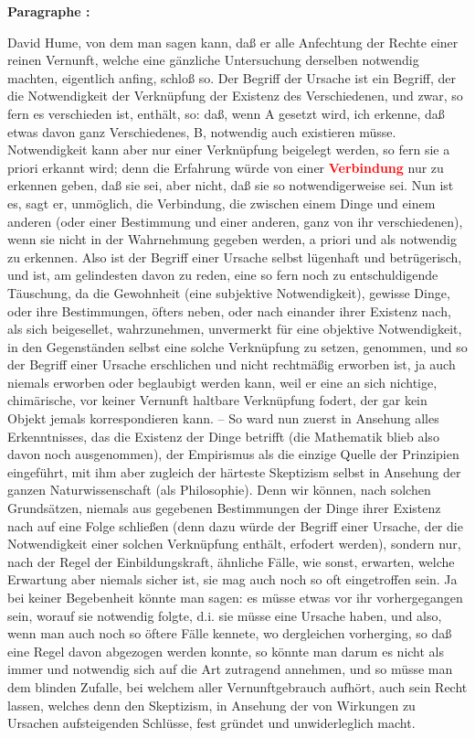 \documentclass[a4paper,12pt,twoside]{book}
\newcommand{\match}[1]{\textcolor{red}{\textbf{#1}}}
\begin{document}
	\noindent\textbf{Paragraphe : }
	
	David Hume, von dem man sagen kann, daß er alle Anfechtung der Rechte einer reinen Vernunft, welche eine gänzliche Untersuchung derselben notwendig machten, eigentlich anfing, schloß so. Der Begriff der Ursache ist ein Begriff, der die Notwendigkeit der Verknüpfung der Existenz des Verschiedenen, und zwar, so fern es verschieden ist, enthält, so: daß, wenn A gesetzt wird, ich erkenne, daß etwas davon ganz Verschiedenes, B, notwendig auch existieren müsse. Notwendigkeit kann aber nur einer Verknüpfung beigelegt werden, so fern sie a priori erkannt wird; denn die Erfahrung würde von einer \match{Verbindung} nur zu erkennen geben, daß sie sei, aber nicht, daß sie so notwendigerweise sei. Nun ist es, sagt er, unmöglich, die Verbindung, die zwischen einem Dinge und einem anderen (oder einer Bestimmung und einer anderen, ganz von ihr verschiedenen), wenn sie nicht in der Wahrnehmung gegeben werden, a priori und als notwendig zu erkennen. Also ist der Begriff einer Ursache selbst lügenhaft und betrügerisch, und ist, am gelindesten davon zu reden, eine so fern noch zu entschuldigende Täuschung, da die Gewohnheit (eine subjektive Notwendigkeit), gewisse Dinge, oder ihre Bestimmungen, öfters neben, oder nach einander ihrer Existenz nach, als sich beigesellet, wahrzunehmen, unvermerkt für eine objektive Notwendigkeit, in den Gegenständen selbst eine solche Verknüpfung zu setzen, genommen, und so der Begriff einer Ursache erschlichen und nicht rechtmäßig erworben ist, ja auch niemals erworben oder beglaubigt werden kann, weil er eine an sich nichtige, chimärische, vor keiner Vernunft haltbare Verknüpfung fodert, der gar kein Objekt jemals korrespondieren kann. – So ward nun zuerst in Ansehung alles Erkenntnisses, das die Existenz der Dinge betrifft (die Mathematik blieb also davon noch ausgenommen), der Empirismus als die einzige Quelle der Prinzipien eingeführt, mit ihm aber zugleich der härteste Skeptizism selbst in Ansehung der ganzen Naturwissenschaft (als Philosophie). Denn wir können, nach solchen Grundsätzen, niemals aus gegebenen Bestimmungen der Dinge ihrer Existenz nach auf eine Folge schließen (denn dazu würde der Begriff einer Ursache, der die Notwendigkeit einer solchen Verknüpfung enthält, erfodert werden), sondern nur, nach der Regel der Einbildungskraft, ähnliche Fälle, wie sonst, erwarten, welche Erwartung aber niemals sicher ist, sie mag auch noch so oft eingetroffen sein. Ja bei keiner Begebenheit könnte man sagen: es müsse etwas vor ihr vorhergegangen sein, worauf sie notwendig folgte, d.i. sie müsse eine Ursache haben, und also, wenn man auch noch so öftere Fälle kennete, wo dergleichen vorherging, so daß eine Regel davon abgezogen werden konnte, so könnte man darum es nicht als immer und notwendig sich auf die Art zutragend annehmen, und so müsse man dem blinden Zufalle, bei welchem aller Vernunftgebrauch aufhört, auch sein Recht lassen, welches denn den Skeptizism, in Ansehung der von Wirkungen zu Ursachen aufsteigenden Schlüsse, fest gründet und unwiderleglich macht. 
	
\end{document}
